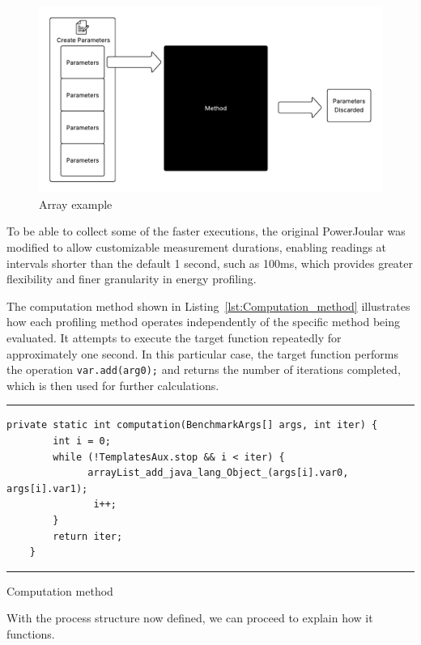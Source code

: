 \begin{figure}[htbp]
  \centering
  \includegraphics[width = 1 \textwidth]{figures/array.pdf}
  \caption{Array example}
  \label{fig:array}
\end{figure}

To be able to collect some of the faster executions, the original PowerJoular was modified to allow customizable measurement durations, enabling readings at intervals shorter than the default 1 second, such as 100ms, which provides greater flexibility and finer granularity in energy profiling.

The computation method shown in Listing~\ref{lst:Computation_method} illustrates how each profiling method operates independently of the specific method being evaluated. It attempts to execute the target function repeatedly for approximately one second. In this particular case, the target function performs the operation \texttt{var.add(arg0);} and returns the number of iterations completed, which is then used for further calculations.

\begin{listing}[H]
\noindent\rule{\linewidth}{0.4pt}
\begin{verbatim}
private static int computation(BenchmarkArgs[] args, int iter) {
        int i = 0;
        while (!TemplatesAux.stop && i < iter) {
              arrayList_add_java_lang_Object_(args[i].var0, args[i].var1);
               i++;
        }
        return iter;
    }
\end{verbatim}
\noindent\rule{\linewidth}{0.4pt}
\caption{Computation method}            
\label{lst:Computation_method}
\end{listing}


With the process structure now defined, we can proceed to explain how it functions.

